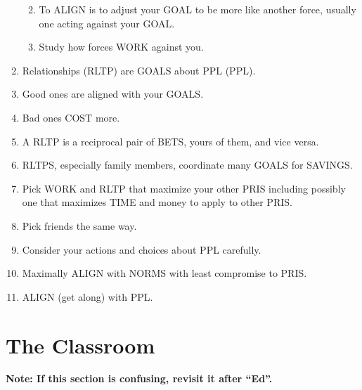 \documentclass[
]{book}
\providecommand{\tightlist}{%
  \setlength{\itemsep}{0pt}\setlength{\parskip}{0pt}}
\begin{document}
\begin{enumerate}
  \begin{enumerate}
  \def\labelenumii{\arabic{enumii}.}
  \tightlist
  \item
    To ALIGN is to adjust your GOAL to be more like another force,
    usually one acting against your GOAL.
  \item
    Study how forces WORK against you.
  \end{enumerate}
\item
  Relationships (RLTP) are GOALS about PPL (PPL).
\item
  Good ones are aligned with your GOALS.
\item
  Bad ones COST more.
\item
  A RLTP is a reciprocal pair of BETS, yours of them, and vice versa.
\item
  RLTPS, especially family members, coordinate many GOALS for SAVINGS.
\item
  Pick WORK and RLTP that maximize your other PRIS including possibly
  one that maximizes TIME and money to apply to other PRIS.
\item
  Pick friends the same way.
\item
  Consider your actions and choices about PPL carefully.
\item
  Maximally ALIGN with NORMS with least compromise to PRIS.
\item
  ALIGN (get along) with PPL.
\end{enumerate}

\hypertarget{the-classroom}{%
\section{The Classroom}\label{the-classroom}}

\textbf{Note: If this section is confusing, revisit it after ``Ed''.}
\end{document}
